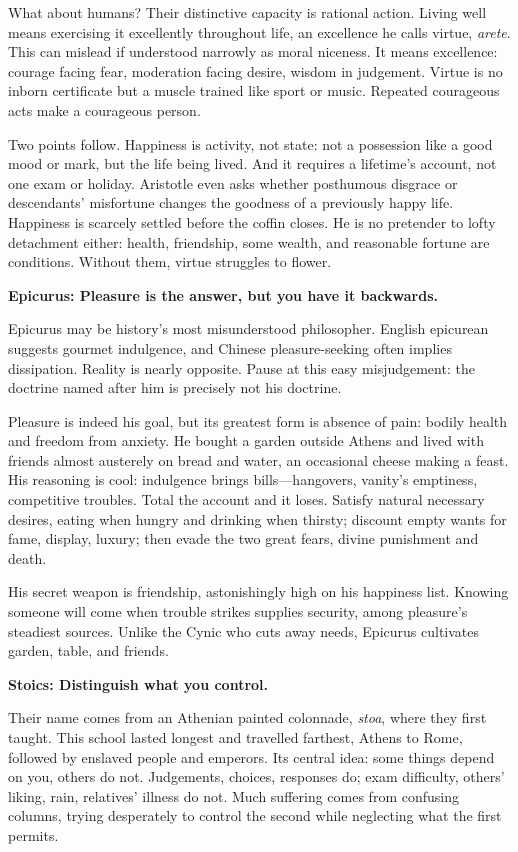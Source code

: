 What about humans? Their distinctive capacity is rational action. Living well means exercising it excellently throughout life, an excellence he calls virtue, \textit{arete}. This can mislead if understood narrowly as moral niceness. It means excellence: courage facing fear, moderation facing desire, wisdom in judgement. Virtue is no inborn certificate but a muscle trained like sport or music. Repeated courageous acts make a courageous person.

Two points follow. Happiness is activity, not state: not a possession like a good mood or mark, but the life being lived. And it requires a lifetime's account, not one exam or holiday. Aristotle even asks whether posthumous disgrace or descendants' misfortune changes the goodness of a previously happy life. Happiness is scarcely settled before the coffin closes. He is no pretender to lofty detachment either: health, friendship, some wealth, and reasonable fortune are conditions. Without them, virtue struggles to flower.

\textbf{Epicurus: Pleasure is the answer, but you have it backwards.}

Epicurus may be history's most misunderstood philosopher. English epicurean suggests gourmet indulgence, and Chinese pleasure-seeking often implies dissipation. Reality is nearly opposite. Pause at this easy misjudgement: the doctrine named after him is precisely not his doctrine.

Pleasure is indeed his goal, but its greatest form is absence of pain: bodily health and freedom from anxiety. He bought a garden outside Athens and lived with friends almost austerely on bread and water, an occasional cheese making a feast. His reasoning is cool: indulgence brings bills---hangovers, vanity's emptiness, competitive troubles. Total the account and it loses. Satisfy natural necessary desires, eating when hungry and drinking when thirsty; discount empty wants for fame, display, luxury; then evade the two great fears, divine punishment and death.

His secret weapon is friendship, astonishingly high on his happiness list. Knowing someone will come when trouble strikes supplies security, among pleasure's steadiest sources. Unlike the Cynic who cuts away needs, Epicurus cultivates garden, table, and friends.

\textbf{Stoics: Distinguish what you control.}

Their name comes from an Athenian painted colonnade, \textit{stoa}, where they first taught. This school lasted longest and travelled farthest, Athens to Rome, followed by enslaved people and emperors. Its central idea: some things depend on you, others do not. Judgements, choices, responses do; exam difficulty, others' liking, rain, relatives' illness do not. Much suffering comes from confusing columns, trying desperately to control the second while neglecting what the first permits.

